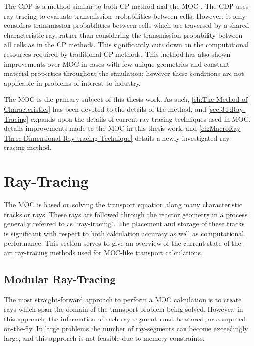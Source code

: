 {{    The \ac{CDP} is a method similar to both \ac{CP} method and the \ac{MOC} \cite{Hong1999,Liu2014}.
    The \ac{CDP} uses ray-tracing to evaluate transmission probabilities between cells.
    However, it only considers transmission probabilities between cells which are traversed by a shared characteristic ray, rather than considering the transmission probability between all cells as in the \ac{CP} methods.
    This significantly cuts down on the computational resources required by traditional \ac{CP} methods.
    This method has also shown improvements over \ac{MOC} in cases with few unique geometries and constant material properties throughout the simulation; however these conditions are not applicable in problems of interest to industry.

    The \ac{MOC} is the primary subject of this thesis work.
    As such, \cref{ch:The Method of Characteristics} has been devoted to the details of the method, and \cref{sec:3T:Ray-Tracing} expands upon the details of current ray-tracing techniques used in \ac{MOC}.
     details improvements made to the \ac{MOC} in this thesis work, and \cref{ch:MacroRay Three-Dimensional Ray-tracing Technique} details a newly investigated ray-tracing method.
  }

  \section{Ray-Tracing}{\label{sec:3T:Ray-Tracing}
    The \acf{MOC} \cite{Askew1972} is based on solving the transport equation along many characteristic tracks or rays.
    These rays are followed through the reactor geometry in a process generally referred to as ``ray-tracing''.
    The placement and storage of these tracks is significant with respect to both calculation accuracy as well as computational performance.
    This section serves to give an overview of the current state-of-the-art ray-tracing methods used for \ac{MOC}-like transport calculations.

    \subsection{Modular Ray-Tracing}{\label{ssec:RT:Modular Ray-Tracing}
      The most straight-forward approach to perform a \ac{MOC} calculation is to create rays which span the domain of the transport problem being solved.
      However, in this approach, the information of each ray-segment must be stored, or computed on-the-fly.
      In large problems the number of ray-segments can become exceedingly large, and this approach is not feasible due to memory constraints.

}}}
